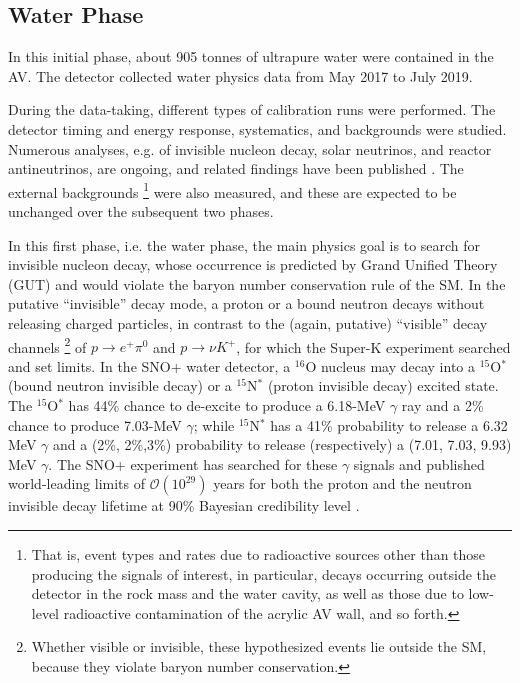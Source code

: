 \subsection{Water Phase} \label{sect:waterPhase}

In this initial phase, about 905 tonnes of ultrapure water were contained in the AV. The detector collected water physics data from May 2017 to July 2019.

During the data-taking, different types of calibration runs were performed. The detector timing and energy response, systematics, and backgrounds were studied. Numerous analyses, e.g. of invisible nucleon decay, solar neutrinos, and reactor antineutrinos, are ongoing, and related findings have been published \cite{anderson2019measurement,anderson2019search,anderson2020measurement,anderson2021optical}. The external backgrounds \footnote{That is, event types and rates due to radioactive sources other than those producing the signals of interest, in particular, decays occurring outside the detector in the rock mass and the water cavity, as well as those due to low-level radioactive contamination of the acrylic AV wall, and so forth.} were also measured, and these are expected to be unchanged over the subsequent two phases.

In this first phase, i.e. the water phase, the main physics goal is to search for invisible nucleon decay, whose occurrence is predicted by Grand Unified Theory (GUT) and would violate the baryon number conservation rule of the SM. In the putative ``invisible'' decay mode, a proton or a bound neutron decays without releasing charged particles, in contrast to the (again, putative) ``visible'' decay channels \footnote{Whether visible or invisible, these hypothesized events lie outside the SM, because they violate baryon number conservation.} of $p\to e^+ \pi^0$ and $p\to\nu K^+$, for which the Super-K experiment searched and set limits. In the SNO+ water detector, a $^{16}$O nucleus may decay into a $^{15}$O$^*$ (bound neutron invisible decay) or a $ ^{15}$N$^*$ (proton invisible decay) excited state. The $^{15}$O$^*$ has 44\% chance to de-excite to produce a 6.18-MeV $\gamma$ ray and a 2\% chance to produce 7.03-MeV $\gamma$; while $^{15}$N$^*$ has a 41\% probability to release a 6.32 MeV $\gamma$ and a (2\%, 2\%,3\%) probability to release (respectively) a (7.01, 7.03, 9.93) MeV $\gamma$. The SNO+ experiment has searched for these $\gamma$ signals and published world-leading limits of $\mathcal{O}(10^{29})$ years for both the proton and the neutron invisible decay lifetime at 90\% Bayesian credibility level \cite{anderson2019search}. 

